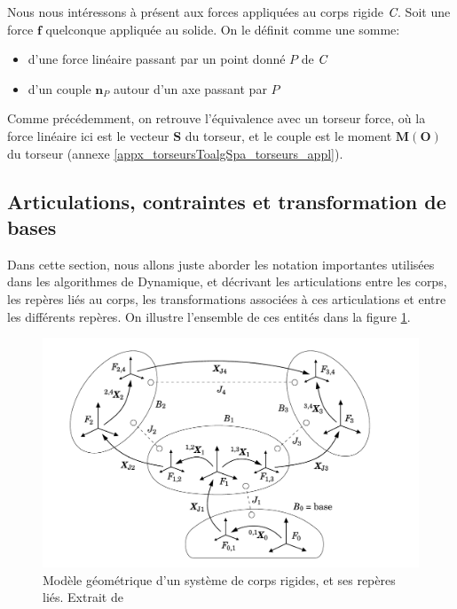 \documentclass{report}
\begin{document}
Nous nous intéressons à présent aux forces appliquées au corps rigide $\emph{C}$. Soit une force $\textbf{f}$ quelconque appliquée au solide. On le définit comme une somme:
\begin{itemize}
\item d'une force linéaire passant par un point donné $P$ de $\emph{C}$
\item d'un couple $\textbf{n}_{P}$ autour d'un axe passant par $P$
\end{itemize}

Comme précédemment, on retrouve l'équivalence avec un torseur force, où la force linéaire ici est le vecteur $\mathbf{S}$ du torseur, et le couple est le moment $\mathbf{M(O)}$ du torseur (annexe \ref{appx_torseursToalgSpa_torseurs_appl}).


\subsection{Articulations, contraintes et transformation de bases} \label{ch_algSpa_transformations}

Dans cette section, nous allons juste aborder les notation importantes utilisées dans les algorithmes de Dynamique, et décrivant les articulations entre les corps, les repères liés au corps, les transformations associées à ces articulations et entre les différents repères. On illustre l'ensemble de ces entités dans la figure \ref{fig_corpsEtReperes}.

\begin{figure}[H]
  \centering
  \includegraphics[width=\textwidth]{figs/modeleGeoEtArticulations.png}
  \caption{Modèle géométrique d'un système de corps rigides, et ses repères liés. Extrait de \cite[section 4.2, figure 4.7]{bib_featherstone}}
  \label{fig_corpsEtReperes}
\end{figure}
\end{document}
